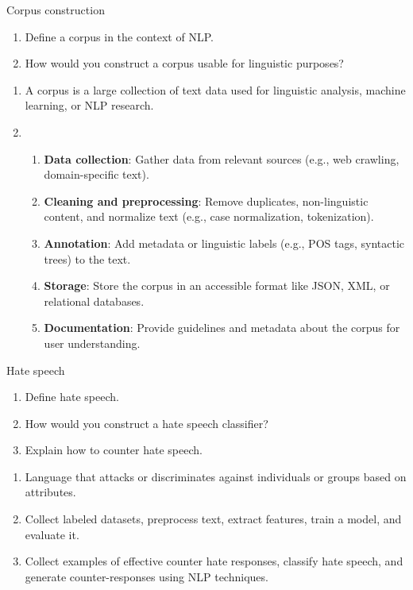 \documentclass{article}
\begin{document}
\begin{exercise}{Corpus construction}\label{ex:corpus}
  \begin{enumerate}
    \item Define a corpus in the context of NLP.
    \item How would you construct a corpus usable for linguistic purposes?
  \end{enumerate}

  \begin{solution}
    \begin{enumerate}
      \item A corpus is a large collection of text data used for linguistic analysis, machine learning, or NLP research.
      \item \begin{enumerate}
          \item \textbf{Data collection}: Gather data from relevant sources (e.g., web crawling, domain-specific text).
          \item \textbf{Cleaning and preprocessing}: Remove duplicates, non-linguistic content, and normalize text (e.g., case normalization, tokenization).
          \item \textbf{Annotation}: Add metadata or linguistic labels (e.g., POS tags, syntactic trees) to the text.
          \item \textbf{Storage}: Store the corpus in an accessible format like JSON, XML, or relational databases.
          \item \textbf{Documentation}: Provide guidelines and metadata about the corpus for user understanding.
        \end{enumerate}
    \end{enumerate}
  \end{solution}
\end{exercise}

\begin{exercise}{Hate speech}\label{ex:hate-speech}
  \begin{enumerate}
    \item Define hate speech.
    \item How would you construct a hate speech classifier?
    \item Explain how to counter hate speech.
  \end{enumerate}

  \begin{solution}
    \begin{enumerate}
        \item Language that attacks or discriminates against individuals or groups based on attributes.
        \item Collect labeled datasets, preprocess text, extract features, train a model, and evaluate it.
        \item Collect examples of effective counter hate responses, classify hate speech, and generate counter-responses using NLP techniques.
    \end{enumerate}
  \end{solution}
\end{exercise}
\end{document}
